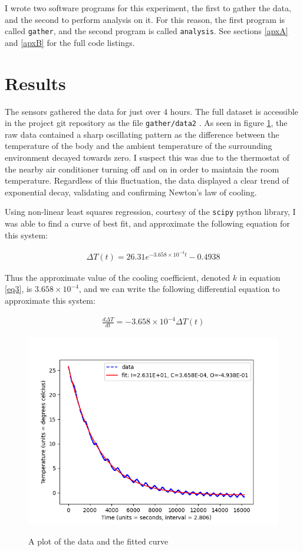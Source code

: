 \documentclass[12pt]{article}
\begin{document}
I wrote two software programs for this experiment,
the first to gather the data,
and the second to perform analysis on it.
For this reason, the first program
is called \texttt{gather},
and the second program is called \texttt{analysis}.
See sections \ref{apxA} and \ref{apxB} for the full code listings.


\section{Results}

The sensors gathered the data
for just over 4 hours.
The full dataset is accessible
in the project git repository
as the file \texttt{gather/data2} \citep{project_repo}.
As seen in figure \ref{fig1},
the raw data contained
a sharp oscillating pattern
as the difference between
the temperature of the body
and the ambient temperature
of the surrounding environment
decayed towards zero.
I suspect this was due
to the thermostat of the nearby air conditioner
turning off and on in order to maintain the room temperature.
Regardless of this fluctuation,
the data displayed a clear trend
of exponential decay,
validating and confirming
Newton's law of cooling.

Using non-linear least squares regression,
courtesy of the \texttt{scipy} python library,
I was able to find a curve of best fit,
and approximate the following equation for this system:

\begin{align}
	\Delta T(t) = 26.31e^{-3.658 \times 10^{-4} t} - 0.4938
\end{align}

Thus the approximate value of the cooling coefficient,
denoted $k$ in equation \ref{eq3},
is $3.658 \times 10^{-4}$,
and we can write the following differential equation
to approximate this system:

\begin{align}
	\frac{d\Delta T}{dt} = -3.658 \times 10^{-4}\Delta T(t)
\end{align}

\begin{figure}
	\includegraphics[scale=0.8]{Figure_1.png}
	\centering
	\label{fig1}
	\caption{A plot of the data and the fitted curve}
\end{figure}
\end{document}
